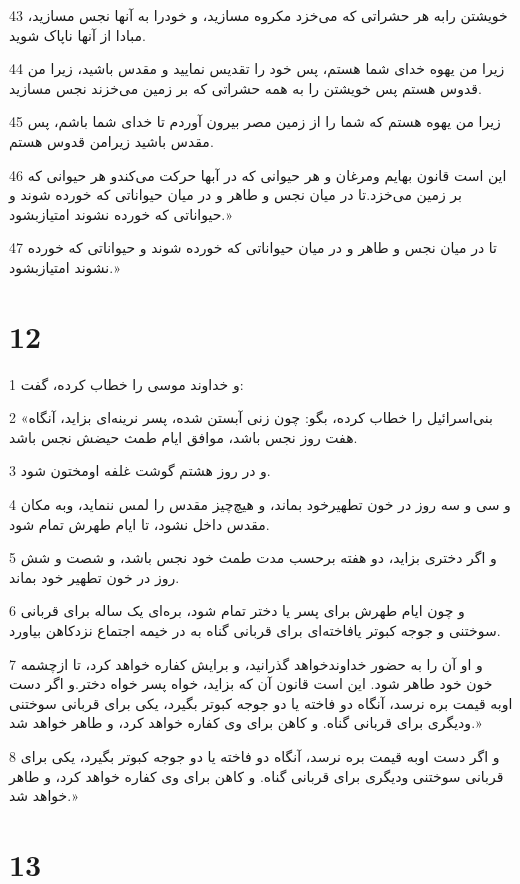 \par 43 خویشتن رابه هر حشراتی که می‌خزد مکروه مسازید، و خودرا به آنها نجس مسازید، مبادا از آنها ناپاک شوید.
\par 44 زیرا من یهوه خدای شما هستم، پس خود را تقدیس نمایید و مقدس باشید، زیرا من قدوس هستم پس خویشتن را به همه حشراتی که بر زمین می‌خزند نجس مسازید.
\par 45 زیرا من یهوه هستم که شما را از زمین مصر بیرون آوردم تا خدای شما باشم، پس مقدس باشید زیرامن قدوس هستم.
\par 46 این است قانون بهایم ومرغان و هر حیوانی که در آبها حرکت می‌کندو هر حیوانی که بر زمین می‌خزد.تا در میان نجس و طاهر و در میان حیواناتی که خورده شوند و حیواناتی که خورده نشوند امتیازبشود.»
\par 47 تا در میان نجس و طاهر و در میان حیواناتی که خورده شوند و حیواناتی که خورده نشوند امتیازبشود.»
 
\chapter{12}

\par 1 و خداوند موسی را خطاب کرده، گفت:
\par 2 «بنی‌اسرائیل را خطاب کرده، بگو: چون زنی آبستن شده، پسر نرینه‌ای بزاید، آنگاه هفت روز نجس باشد، موافق ایام طمث حیضش نجس باشد.
\par 3 و در روز هشتم گوشت غلفه اومختون شود.
\par 4 و سی و سه روز در خون تطهیرخود بماند، و هیچ‌چیز مقدس را لمس ننماید، وبه مکان مقدس داخل نشود، تا ایام طهرش تمام شود.
\par 5 و اگر دختری بزاید، دو هفته برحسب مدت طمث خود نجس باشد، و شصت و شش روز در خون تطهیر خود بماند.
\par 6 و چون ایام طهرش برای پسر یا دختر تمام شود، بره‌ای یک ساله برای قربانی سوختنی و جوجه کبوتر یافاخته‌ای برای قربانی گناه به در خیمه اجتماع نزدکاهن بیاورد.
\par 7 و او آن را به حضور خداوندخواهد گذرانید، و برایش کفاره خواهد کرد، تا ازچشمه خون خود طاهر شود. این است قانون آن که بزاید، خواه پسر خواه دختر.و اگر دست اوبه قیمت بره نرسد، آنگاه دو فاخته یا دو جوجه کبوتر بگیرد، یکی برای قربانی سوختنی ودیگری برای قربانی گناه. و کاهن برای وی کفاره خواهد کرد، و طاهر خواهد شد.»
\par 8 و اگر دست اوبه قیمت بره نرسد، آنگاه دو فاخته یا دو جوجه کبوتر بگیرد، یکی برای قربانی سوختنی ودیگری برای قربانی گناه. و کاهن برای وی کفاره خواهد کرد، و طاهر خواهد شد.»
 
\chapter{13}

